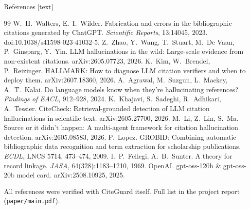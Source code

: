 \documentclass[aspectratio=169,10pt]{beamer}
\begin{document}
\begin{frame}{References}
  \scriptsize
  [text]
  \begin{thebibliography}{99}\setlength{\itemsep}{0pt}
     W.~H.~Walters, E.~I.~Wilder. Fabrication and errors in the bibliographic citations generated by ChatGPT. \emph{Scientific Reports}, 13:14045, 2023. doi:10.1038/s41598-023-41032-5.
     Z.~Zhao, Y.~Wang, T.~Stuart, M.~De Vaan, P.~Ginsparg, Y.~Yin. LLM hallucinations in the wild: Large-scale evidence from non-existent citations. arXiv:2605.07723, 2026.
     K.~Kim, W.~Brendel, P.~Reizinger. HALLMARK: How to diagnose LLM citation verifiers and when to deploy them. arXiv:2607.18360, 2026.
     A.~Agrawal, M.~Suzgun, L.~Mackey, A.~T.~Kalai. Do language models know when they're hallucinating references? \emph{Findings of EACL}, 912--928, 2024.
     K.~Khajavi, S.~Sadeghi, R.~Adhikari, A.~Tessier. CiteCheck: Retrieval-grounded detection of LLM citation hallucinations in scientific text. arXiv:2605.27700, 2026.
     M.~Li, Z.~Lin, S.~Ma. Source or it didn't happen: A multi-agent framework for citation hallucination detection. arXiv:2605.08583, 2026.
     P.~Lopez. GROBID: Combining automatic bibliographic data recognition and term extraction for scholarship publications. \emph{ECDL}, LNCS 5714, 473--474, 2009.
     I.~P.~Fellegi, A.~B.~Sunter. A theory for record linkage. \emph{JASA}, 64(328):1183--1210, 1969.
     OpenAI. gpt-oss-120b \& gpt-oss-20b model card. arXiv:2508.10925, 2025.
  \end{thebibliography}
  \vspace{2pt}
  \tiny All references were verified with CiteGuard itself. Full list in the project report (\texttt{paper/main.pdf}).
\end{frame}
\end{document}
